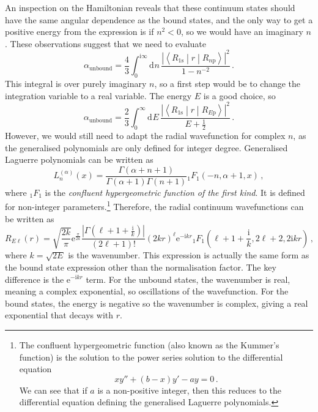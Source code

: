 \documentclass{article}
\theoremstyle{plain}\theoremheaderfont{\normalfont\itshape}\theorembodyfont{\rmfamily}\theoremseparator{.}\newtheorem*{rem}{Remark}\newtheorem*{ex}{Example}\newtheorem*{proof}{Proof}\newtheorem*{altp}{Alternative proof}
\theoremstyle{plain}\theoremheaderfont{\normalfont\bfseries}\theorembodyfont{\rmfamily}\theoremseparator{.}\newtheorem{thm}{Theorem}[section]\newtheorem{lem}[thm]{Lemma}\newtheorem{prop}[thm]{Proposition}\newtheorem*{cor}{Corollary}\newtheorem{defn}[thm]{Definition}\newtheorem{clm}[thm]{Claim}\newtheorem{clminproof}{Claim}
\theoremstyle{break}\theoremheaderfont{\normalfont\itshape}\theorembodyfont{\rmfamily}\theoremseparator{.\medskip}\newtheorem*{proofskip}{Proof}\newtheorem*{exs}{Examples}\newtheorem*{rems}{Remarks}
\theoremstyle{break}\theoremheaderfont{\normalfont\bfseries}\theorembodyfont{\rmfamily}\theoremseparator{.\medskip}\newtheorem{lemskip}[thm]{Lemma}\newtheorem{defnskip}[thm]{Definition}\newtheorem{propskip}[thm]{Proposition}\newtheorem{thmskip}[thm]{Theorem}
\numberwithin{equation}{section}
\newcommand{\ii}{\mathrm{i}}
\newcommand{\ee}{\mathrm{e}}
\newcommand{\dd}[2][]{\mathrm{d}^{#1} #2\,}
\newcommand{\mel}[3]{\left\langle #1 \middle| #2 \middle| #3 \right\rangle}
\newcommand{\abs}[1]{\left| #1 \right|}
\begin{document}
    An inspection on the Hamiltonian reveals that these continuum states should have the same angular dependence as the bound states, and the only way to get a positive energy from the expression is if \(n^2<0\), so we would have an imaginary \(n\). These observations suggest that we need to evaluate
    \begin{equation}
        \alpha_{\text{unbound}}=\frac{4}{3}\int_{0}^{\ii\infty}\dd{n}\frac{\abs{\mel{R_{1\mathrm{s}}}{r}{R_{n\mathrm{p}}}}^2}{1-n^{-2}}\,.
    \end{equation}
    This integral is over purely imaginary \(n\), so a first step would be to change the integration variable to a real variable. The energy \(E\) is a good choice, so
    \begin{equation}
        \alpha_{\text{unbound}}=\frac{2}{3}\int_{0}^{\infty}\dd{E}\frac{\abs{\mel{R_{1\mathrm{s}}}{r}{R_{E\mathrm{p}}}}^2}{E+\frac{1}{2}}\,.
    \end{equation}
    However, we would still need to adapt the radial wavefunction for complex \(n\), as the generalised polynomials are only defined for integer degree. Generalised Laguerre polynomials can be written as
    \begin{equation}
        L_n^{(\alpha)}(x)=\frac{\Gamma(\alpha+n+1)}{\Gamma(\alpha+1)\Gamma(n+1)}{_1F_1}(-n,\alpha+1,x)\,,
    \end{equation}
    where \(_1F_1\) is the \textit{confluent hypergeometric function of the first kind}. It is defined for non-integer parameters.\footnote{The confluent hypergeometric function (also known as the Kummer's function) is the solution to the power series solution to the differential equation
    \begin{equation}
        xy''+(b-x)y'-ay=0\,.
    \end{equation}
    We can see that if \(a\) is a non-positive integer, then this reduces to the differential equation defining the generalised Laguerre polynomials.} Therefore, the radial continuum wavefunctions can be written as
    \begin{equation}
        R_{E\ell}(r)=\sqrt{\frac{2k}{\pi}}\ee^{\frac{\pi}{2k}}\frac{\abs{\Gamma\left(\ell+1+\frac{\ii}{k}\right)}}{(2\ell +1)!}(2kr)^{\ell}\ee^{-\ii kr}{_1F_1}\left(\ell+1+\frac{\ii}{k},2\ell+2,2\ii kr\right)\,,
    \end{equation}
    where \(k=\sqrt{2E}\) is the wavenumber. This expression is actually the same form as the bound state expression other than the normalisation factor. The key difference is the \(\ee^{-\ii kr}\) term. For the unbound states, the wavenumber is real, meaning a complex exponential, so oscillations of the wavefunction. For the bound states, the energy is negative so the wavenumber is complex, giving a real exponential that decays with \(r\).
\end{document}
